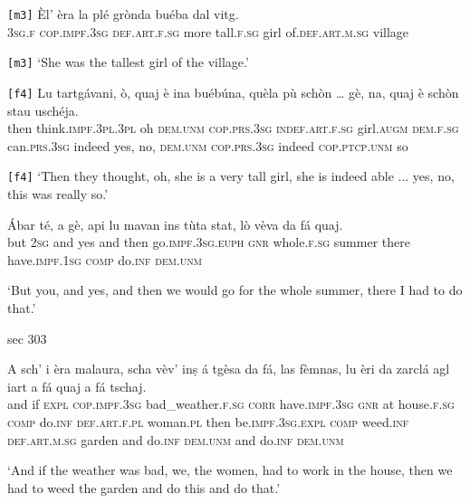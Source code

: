 \begin{linenumbers}
	\gll  \texttt{[m3]} Èl’ èra la plé grònda buéba dal vitg.  \\
{} \textsc{3sg.f} \textsc{cop.impf.3sg} \textsc{def.art.f.sg} more tall.\textsc{f.sg} girl of.\textsc{def.art.m.sg} village	\\
\end{linenumbers}
\medskip
\glt \texttt{[m3]} `She was the tallest girl of the village.'
\medskip

\begin{linenumbers}
	\gll \texttt{[f4]} Lu tartgávani, ò, quaj è ina buébúna, quèla pù schòn … gè, na, quaj è schòn stau uschéja.    \\
	{} then think.\textsc{impf.3pl.3pl} oh \textsc{dem.unm} \textsc{cop.prs.3sg} \textsc{indef.art.f.sg} girl.\textsc{augm} \textsc{dem.f.sg} can.\textsc{prs.3sg} indeed {} yes, no, \textsc{dem.unm} \textsc{cop.prs.3sg} indeed \textsc{cop.ptcp.unm} so\\
\end{linenumbers}
\medskip
\glt \texttt{[f4]} `Then they thought, oh, she is a very tall girl, she is indeed able ... yes, no, this was really so.'
\medskip

\begin{linenumbers}
	\gll Ábar té, a gè, api lu mavan ins tùta stat, lò vèva da fá quaj.\\
	but \textsc{2sg} and yes and then go.\textsc{impf.3sg.euph} \textsc{gnr} whole.\textsc{f.sg} summer there have.\textsc{impf.1sg} \textsc{comp} do.\textsc{inf} \textsc{dem.unm}\\
\end{linenumbers}
\medskip
\glt `But you, and yes, and then we would go for the whole summer, there I had to do that.'
\medskip

sec 303

\begin{linenumbers}
	\gll A sch’ i èra malaura, scha vèv’ inṣ á tgèsa da fá, las fèmnas, lu èri da zarclá agl iart a fá quaj a fá tschaj.\\
	and if \textsc{expl} \textsc{cop.impf.3sg} bad\_weather.\textsc{f.sg} \textsc{corr} have.\textsc{impf.3sg} \textsc{gnr} at house.\textsc{f.sg} \textsc{comp} do.\textsc{inf} \textsc{def.art.f.pl} woman.\textsc{pl} then be.\textsc{impf.3sg.expl} \textsc{comp} weed.\textsc{inf} \textsc{def.art.m.sg} garden and do.\textsc{inf} \textsc{dem.unm} and do.\textsc{inf} \textsc{dem.unm}\\
\end{linenumbers}
\medskip
\glt `And if the weather was bad, we, the women, had to work in the house, then we had to weed the garden and do this and do that.'
\medskip

